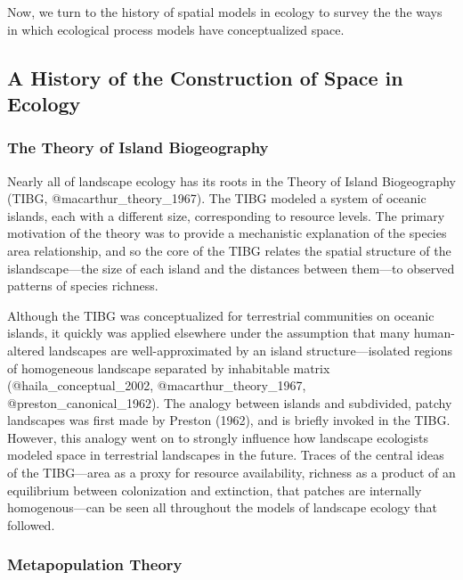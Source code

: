 Now, we turn to the history of spatial models in ecology to survey the
the ways in which ecological process models have conceptualized space.

\hypertarget{a-history-of-the-construction-of-space-in-ecology}{%
\subsection{A History of the Construction of Space in
Ecology}\label{a-history-of-the-construction-of-space-in-ecology}}

\hypertarget{the-theory-of-island-biogeography}{%
\subsubsection{The Theory of Island
Biogeography}\label{the-theory-of-island-biogeography}}

Nearly all of landscape ecology has its roots in the Theory of Island
Biogeography (TIBG, @macarthur\_theory\_1967). The TIBG modeled a system
of oceanic islands, each with a different size, corresponding to
resource levels. The primary motivation of the theory was to provide a
mechanistic explanation of the species area relationship, and so the
core of the TIBG relates the spatial structure of the islandscape---the
size of each island and the distances between them---to observed
patterns of species richness.

Although the TIBG was conceptualized for terrestrial communities on
oceanic islands, it quickly was applied elsewhere under the assumption
that many human-altered landscapes are well-approximated by an island
structure---isolated regions of homogeneous landscape separated by
inhabitable matrix (@haila\_conceptual\_2002, @macarthur\_theory\_1967,
@preston\_canonical\_1962). The analogy between islands and subdivided,
patchy landscapes was first made by Preston (1962), and is briefly
invoked in the TIBG. However, this analogy went on to strongly influence
how landscape ecologists modeled space in terrestrial landscapes in the
future. Traces of the central ideas of the TIBG---area as a proxy for
resource availability, richness as a product of an equilibrium between
colonization and extinction, that patches are internally
homogenous---can be seen all throughout the models of landscape ecology
that followed.

\hypertarget{metapopulation-theory}{%
\subsubsection{Metapopulation Theory}\label{metapopulation-theory}}

